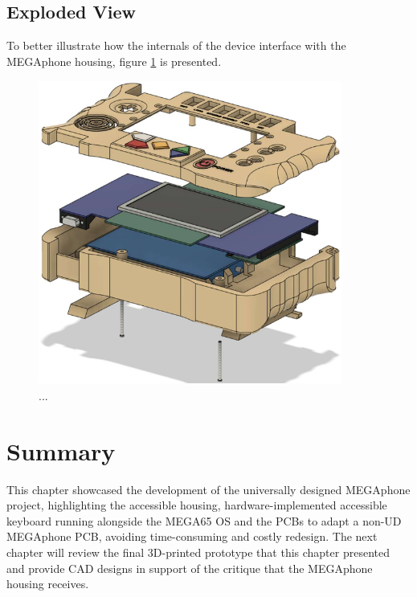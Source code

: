 \subsection{Exploded View}

To better illustrate how the internals of the device interface with the MEGAphone housing, figure \ref{fig:Exploded} is presented.

\begin{figure} [h]
    \centering
    \includegraphics[width=10cm,height=10cm,keepaspectratio]{Figures/exploded_view.png}
    \caption{...}
    \label{fig:Exploded}
\end{figure}


\section{Summary}  %
This chapter showcased the development of the universally designed MEGAphone project, highlighting the accessible housing, hardware-implemented accessible keyboard running alongside the MEGA65 OS and the PCBs to adapt a non-UD MEGAphone PCB, avoiding time-consuming and costly redesign.
The next chapter will review the final 3D-printed prototype that this chapter presented and provide CAD designs in support of the critique that the MEGAphone housing receives.
